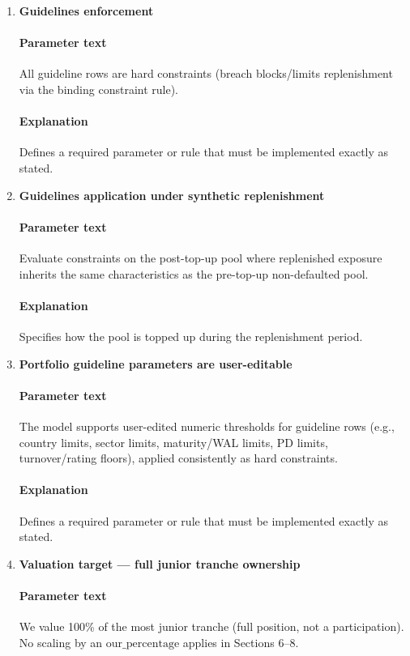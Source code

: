 \documentclass[11pt]{article}
\begin{document}
\begin{enumerate}[label=\arabic*),leftmargin=*,align=left]
\item \textbf{Guidelines enforcement}
\paragraph{Parameter text} All guideline rows are hard constraints (breach blocks/limits replenishment via the binding constraint rule).
\paragraph{Explanation} Defines a required parameter or rule that must be implemented exactly as stated.

\item \textbf{Guidelines application under synthetic replenishment}
\paragraph{Parameter text} Evaluate constraints on the post-top-up pool where replenished exposure inherits the same characteristics as the pre-top-up non-defaulted pool.
\paragraph{Explanation} Specifies how the pool is topped up during the replenishment period.

\item \textbf{Portfolio guideline parameters are user-editable}
\paragraph{Parameter text} The model supports user-edited numeric thresholds for guideline rows (e.g., country limits, sector limits, maturity/WAL limits, PD limits, turnover/rating floors), applied consistently as hard constraints. 
\paragraph{Explanation} Defines a required parameter or rule that must be implemented exactly as stated.

\item \textbf{Valuation target — full junior tranche ownership}
\paragraph{Parameter text} We value 100\% of the most junior tranche (full position, not a participation). No scaling by an $\text{our\_percentage}$ applies in Sections 6–8.

\end{enumerate}
\end{document}
